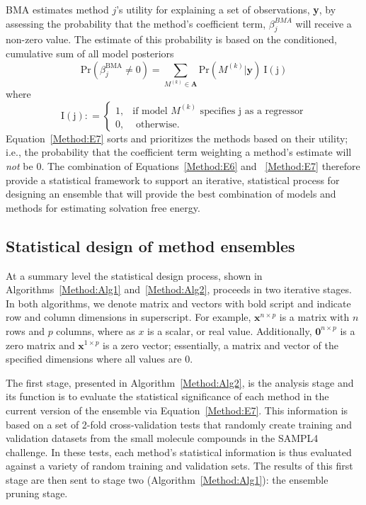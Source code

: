 \documentclass[journal=jpcbfk, manuscript=article]{achemso}
\newcommand{\+}[1]{\ensuremath{\mathbf{#1}}}
\begin{document}
BMA estimates method $j$'s utility for explaining a set of observations, \textbf{y}, by assessing the probability that the method's coefficient term, $\beta^{BMA}_j$ will receive a non-zero value.
The estimate of this probability is based on the conditioned, cumulative sum of all model posteriors
\begin{equation} \label{Method:E7} 
	\mathrm{Pr}(\beta_j^{\text{BMA}}\neq 0) =   \sum_{M^{(k)}\in\mathbf{A}} {\mathrm{Pr}}(M^{(k)} | \textbf{y}) \:{\mathrm{I(j)}}
\end{equation}
where
\begin{equation} \label{eq:bma-prob-neq0-ID}
	\mathrm{I(j)}: =
	\begin{cases} 
		1,&\text{if model $M^{(k)}$ specifies j as a regressor} \\
		0,&\text{ otherwise}.
	\end{cases}
\end{equation}
Equation~\ref{Method:E7} sorts and prioritizes the methods based on their utility; i.e., the probability that the coefficient term weighting a method's estimate will \emph{not} be 0.
The combination of Equations~\ref{Method:E6} and ~\ref{Method:E7} therefore provide a statistical framework to support an iterative, statistical process for designing an ensemble that will provide the best combination of models and methods for estimating solvation free energy.



 \subsection{Statistical design of method ensembles}
 \label{Method:StatEnsemble:Design}
At a summary level the statistical design process, shown in Algorithms~\ref{Method:Alg1} and~\ref{Method:Alg2}, proceeds in two iterative stages. 
In both algorithms, we denote matrix and vectors with bold script and indicate row and column dimensions in superscript.
For example, $\textbf{x}^{n \times p}$ is a matrix with $n$ rows and $p$ columns, where as $x$ is a scalar, or real value.
Additionally,  $\textbf{0}^{n \times p}$ is a zero matrix and  $\textbf{x}^{1 \times p}$ is a zero vector; essentially, a matrix and vector of the specified dimensions where all values are 0.
 
 The first stage, presented in Algorithm~\ref{Method:Alg2}, is the analysis stage and its function is to evaluate the statistical significance of each method in the current version of the ensemble via Equation~\ref{Method:E7}.
This information is based on a set of 2-fold cross-validation tests that randomly create training and validation datasets from the small molecule compounds  in the SAMPL4 challenge.
In these tests, each method's statistical information is thus evaluated against a variety of random training and validation sets.
The results of this first stage are then sent to stage two (Algorithm~\ref{Method:Alg1}): the ensemble pruning stage.
\end{document}
